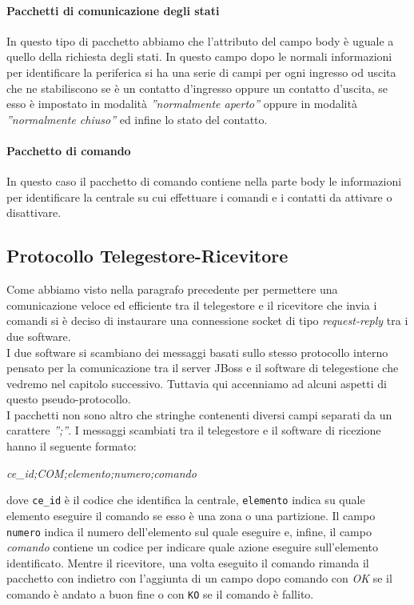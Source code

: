 \paragraph{Pacchetti di comunicazione degli stati}
In questo tipo di pacchetto abbiamo che l'attributo del campo body è uguale a quello della richiesta degli stati. In questo campo dopo le normali informazioni per identificare la periferica si ha una serie di campi per ogni ingresso od uscita che ne stabiliscono se è un contatto d'ingresso oppure un contatto d'uscita, se esso è impostato in modalità \emph{''normalmente aperto''} oppure in modalità \emph{''normalmente chiuso''} ed infine lo stato del contatto.
\paragraph{Pacchetto di comando}
In questo caso il pacchetto di comando contiene nella parte body le informazioni per identificare la centrale su cui effettuare i comandi e i contatti da attivare o disattivare.
\subsection{Protocollo Telegestore-Ricevitore}
Come abbiamo visto nella paragrafo precedente per permettere una comunicazione veloce ed efficiente tra il telegestore e il ricevitore che invia i comandi si è deciso di instaurare una connessione socket di tipo \emph{request-reply} tra i due software.\\
I due software si scambiano dei messaggi basati sullo stesso protocollo interno pensato per la comunicazione tra il server JBoss e il software di telegestione che vedremo nel capitolo successivo. Tuttavia qui accenniamo ad alcuni aspetti di questo pseudo-protocollo.\\
I pacchetti non sono altro che stringhe contenenti diversi campi separati da un carattere \emph{'';''}. I messaggi scambiati tra il telegestore e il software di ricezione hanno il seguente formato:
\begin{center}
	\textit{ce\_id;COM;elemento;numero;comando}
\end{center}
dove \texttt{ce\_id} è il codice che identifica la centrale, \texttt{elemento} indica su quale elemento eseguire il comando se esso è una zona o una partizione. Il campo \texttt{numero} indica il numero dell'elemento sul quale eseguire e, infine, il campo \emph{comando} contiene un codice per indicare quale azione eseguire sull'elemento identificato. Mentre il ricevitore, una volta eseguito il comando rimanda il pacchetto con indietro con l'aggiunta di un campo dopo comando con \emph{OK} se il comando è andato a buon fine o con \texttt{KO} se il comando è fallito.
